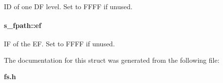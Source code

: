 ID of one DF level. Set to FFFF if unused. 

\paragraph{ {\bf s\_\-fpath::ef}}\hfill\label{structs__fpath_e8103a76874a6b0588c88303126477c7}


IF of the EF. Set to FFFF if unused. 



The documentation for this struct was generated from the following file:\begin{CompactItemize}
\item 
{\bf fs.h}\end{CompactItemize}
